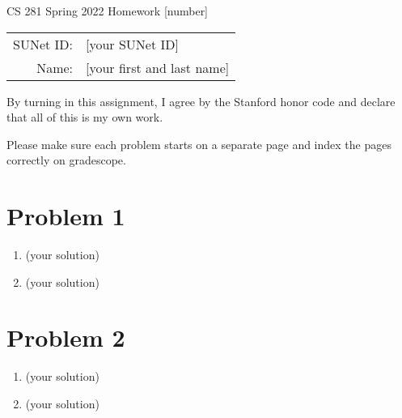 \documentclass[12pt]{article}
\begin{document}
\begin{center}
{\Large CS 281 Spring 2022 Homework [number]}

\begin{tabular}{rl}
SUNet ID: & [your SUNet ID] \\
Name: & [your first and last name] \\
\end{tabular}
\end{center}

By turning in this assignment, I agree by the Stanford honor code and declare
that all of this is my own work.

Please make sure each problem starts on a separate page and index the pages correctly on gradescope.

\section*{Problem 1}

\begin{enumerate}[label=(\alph*)]
  \item (your solution)
  \item (your solution)
\end{enumerate}

\newpage
\section*{Problem 2}

\begin{enumerate}[label=(\alph*)]
  \item (your solution)
  \item (your solution)
\end{enumerate}
\end{document}
